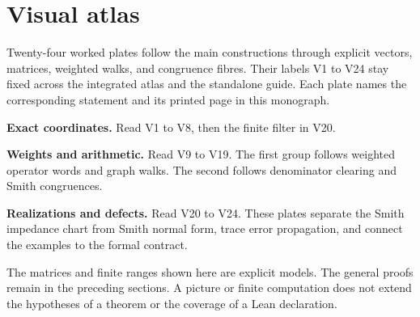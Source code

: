 \documentclass[11pt,a4paper]{article}
\theoremstyle{definition}
\theoremstyle{remark}
\theoremstyle{definition}\newtheorem{construction}[theorem]{Construction}\newtheorem{certificate}[theorem]{Numerical Certificate}
\theoremstyle{remark}\newtheorem{boundary}[theorem]{Boundary}
\begin{document}
\section{Visual atlas}\label{app:visual-atlas}
Twenty-four worked plates follow the main constructions through explicit vectors, matrices, weighted walks, and congruence fibres. Their labels V1 to V24 stay fixed across the integrated atlas and the standalone guide. Each plate names the corresponding statement and its printed page in this monograph.

\begin{readerroadmap}[title={Three routes through the atlas}]
\textbf{Exact coordinates.} Read V1 to V8, then the finite filter in V20.

\textbf{Weights and arithmetic.} Read V9 to V19. The first group follows weighted operator words and graph walks. The second follows denominator clearing and Smith congruences.

\textbf{Realizations and defects.} Read V20 to V24. These plates separate the Smith impedance chart from Smith normal form, trace error propagation, and connect the examples to the formal contract.
\end{readerroadmap}
The matrices and finite ranges shown here are explicit models. The general proofs remain in the preceding sections. A picture or finite computation does not extend the hypotheses of a theorem or the coverage of a Lean declaration.
\clearpage
\begingroup
{}\fontsize{10}{12}\selectfont\setlength{\parskip}{3pt}\setlength{\abovedisplayskip}{6pt}\setlength{\belowdisplayskip}{6pt}

\endgroup
\clearpage

\end{document}

